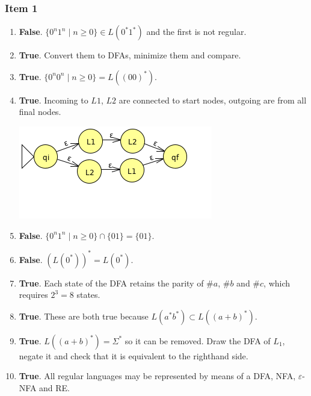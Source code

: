 \subsubsection{Item 1}
\begin{enumerate}[label=(\alph*)]
	\item \textbf{False}. $\{0^n1^n\mid n \geq 0\} \in L(0^*1^*)$ and the first is not regular.
	\item \textbf{True}. Convert them to DFAs, minimize them and compare.
	\item \textbf{True}. $\{0^n0^n\mid n \geq 0\}=L((00)^*)$.
	\item \textbf{True}. Incoming to $L1$, $L2$ are connected to start nodes, outgoing are from all final nodes.
	\begin{center} \includegraphics[scale=0.5,trim={0 20mm 0 0},clip]{2012T1_8_1d} \end{center}
	\item \textbf{False}. $\{0^n1^n\mid n \geq 0\} \cap \{01\} = \{01\}$.
	\item \textbf{False}. $(L(0^*))^*=L(0^*)$.
	\item \textbf{True}. Each state of the DFA retains the parity of $\#a$, $\#b$ and $\#c$, which requires $2^3=8$ states.
	\item \textbf{True}. These are both true because $L(a^*b^*) \subset L((a+b)^*)$.
	\item \textbf{True}. $L((a+b)^*)=\Sigma^*$ so it can be removed. Draw the DFA of $L_1$, negate it and check that it is equivalent to the righthand side.
	\item \textbf{True}. All regular languages may be represented by means of a DFA, NFA, $\varepsilon$-NFA and RE.
\end{enumerate}

